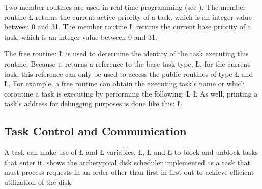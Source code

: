 \documentclass[openright,twoside]{report}
\begin{document}
Two member routines are used in real-time programming (see ).
The member routine \LGinlinetrue\LGbegin\lgrinde\L{}\endlgrinde\LGend{} returns the current active priority of a task, which is an integer value between 0 and 31.
The member routine \LGinlinetrue\LGbegin\lgrinde\L{}\endlgrinde\LGend{} returns the current base priority of a task, which is an integer value between 0 and 31.

The free routine:
\LGinlinefalse\LGbegin\lgrinde
\L{}
\endlgrinde\LGend
{}%
is used to determine the identity of the task executing this routine.
Because it returns a reference to the base task type, \LGinlinetrue\LGbegin\lgrinde\L{}\endlgrinde\LGend{}, for the current task, this reference can only be used to access the public routines of type \LGinlinetrue\LGbegin\lgrinde\L{}\endlgrinde\LGend{} and \LGinlinetrue\LGbegin\lgrinde\L{}\endlgrinde\LGend{}.
For example, a free routine can obtain the executing task's name or which coroutine a task is executing by performing the following:
\LGinlinefalse\LGbegin\lgrinde
\L{}
\L{}
\endlgrinde\LGend
As well, printing a task's address for debugging purposes is done like this:
\LGinlinefalse\LGbegin\lgrinde
\L{}
\CE{}\endlgrinde\LGend


\subsection{Task Control and Communication}

A task can make use of \LGinlinetrue\LGbegin\lgrinde\L{}\endlgrinde\LGend{} and \LGinlinetrue\LGbegin\lgrinde\L{}\endlgrinde\LGend{} variables, \LGinlinetrue\LGbegin\lgrinde\L{}\endlgrinde\LGend{}, \LGinlinetrue\LGbegin\lgrinde\L{}\endlgrinde\LGend{} and \LGinlinetrue\LGbegin\lgrinde\L{}\endlgrinde\LGend{} to block and unblock tasks that enter it.
 shows the archetypical disk scheduler implemented as a task that must process requests in an order other than first-in first-out to achieve efficient utilization of the disk.
\end{document}
